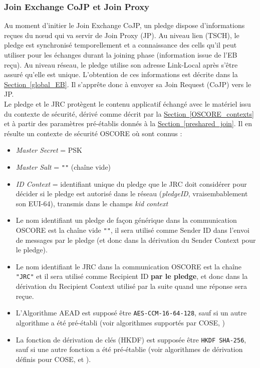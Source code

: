 \documentclass[]{report}
\newcommand{\wordlink}[2]{\hyperref[#2]{#1~\ref{#2}}}
\begin{document}
\newpage

\subsubsection{Join Exchange CoJP et Join Proxy}
\label{join_exchange_CoJP}

Au moment d'initier le Join Exchange CoJP, un pledge dispose d'informations reçues du nœud qui va servir de Join Proxy (JP). Au niveau lien (TSCH), le pledge est synchronisé temporellement et a connaissance des cells qu'il peut utiliser pour les échanges durant la joining phase (information issue de l'EB reçu). Au niveau réseau, le pledge utilise son adresse Link-Local après s'être assuré qu'elle est unique. L'obtention de ces informations est décrite dans la \wordlink{Section}{global_EB}. Il s'apprête donc à envoyer sa Join Request (CoJP) vers le JP.\\


 Le pledge et le JRC protègent le contenu applicatif échangé avec le matériel issu du contexte de sécurité, dérivé comme décrit par la \wordlink{Section}{OSCORE_contexts} et à partir des paramètres pré-établis donnés à la \wordlink{Section}{preshared_join}. Il en résulte un contexte de sécurité OSCORE où sont connus :
 \vspace{0.1cm}
\begin{itemize}[label=$\bullet$]
\item \textit{Master Secret} = PSK

\item \textit{Master Salt} = \texttt{""} (chaîne vide)

\item \textit{ID Context} = identifiant unique du pledge que le JRC doit considérer pour décider si le pledge est autorisé dans le réseau (\textit{pledgeID}, vraisembablement son EUI-64), transmis dans le champs \textit{kid context} 

\item Le nom identifiant un pledge de façon générique dans la communication OSCORE est la chaîne vide \texttt{""}, il sera utilisé comme Sender ID dans l'envoi de messages par le pledge (et donc dans la dérivation du Sender Context pour le pledge).

\item Le nom identifiant le JRC dans la communication OSCORE est la chaîne \texttt{"JRC"} et il sera utilisé comme Recipient ID \textbf{par le pledge}, et donc dans la dérivation du Recipient Context utilisé par la suite quand une réponse sera reçue.

\item L'Algorithme AEAD est supposé être \texttt{AES-CCM-16-64-128}, sauf si un autre algorithme a été pré-établi (voir algorithmes supportés par COSE, \cite{rfc8152})

\item La fonction de dérivation de clés (HKDF) est supposée être \texttt{HKDF SHA-256}, sauf si une autre fonction a été pré-établie (voir algorithmes de dérivation définis pour COSE, \cite{rfc5869} et \cite{rfc5869}).
\end{itemize}
\end{document}

